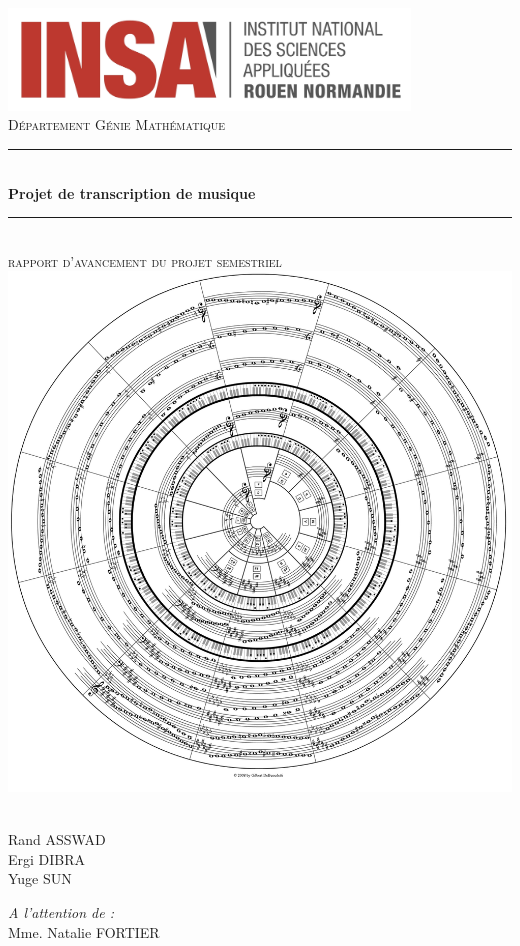 \documentclass[]{article}
\title{}
\author{}
\date{}
\newcommand{\HRule}{\rule{\linewidth}{0.5mm}}
\begin{document}
\begin{titlepage}
  \begin{sffamily}
  \begin{center}
	\includegraphics[width=0.8\textwidth]{img/INSA_logo}\\[2cm]

    \textsc{\huge Département Génie Mathématique}\\[0.7cm]

    \HRule \\[0.4cm]
    {\huge \bfseries Projet de transcription de musique \\[0.4cm]}
    \HRule \\[1cm]
	\textsc{\huge rapport d'avancement du projet semestriel}\\[0.7cm]

    \includegraphics[width=.6\textwidth]{img/cover_img.png}~\\[1cm]

    \begin{minipage}{0.4\textwidth}
		\Large\raggedright
        Rand ASSWAD\\
		Ergi DIBRA\\
		Yuge SUN
    \end{minipage}
    \begin{minipage}{0.4\textwidth}
		\Large\raggedleft
		\emph{A l'attention de :}\\
		Mme. Natalie FORTIER
    \end{minipage}

	\vfill
  \end{center}
  \end{sffamily}
\end{titlepage}
\end{document}
